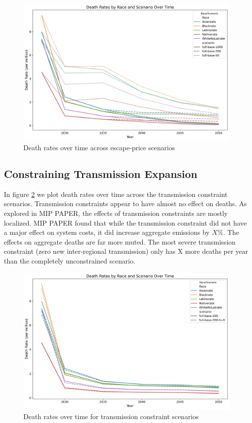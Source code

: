 \documentclass[a4paper]{article}
\theoremstyle{definition}
\theoremstyle{plain}
\begin{document}
\begin{figure}
    \centering
    \includegraphics[width=1\linewidth]{Figures/Output/Compare_scenarios_compare-escape-price_GenX.jpg}
    \caption{Death rates over time across escape-price scenarios}
    \label{EscapePrice}
\end{figure}

\subsection{Constraining Transmission Expansion}
In figure \ref{TransmissionConstraint} we plot death rates over time across the transmission constraint scenarios. Transmission constraints appear to have almost no effect on deaths.  As explored in MIP PAPER, the effects of transmission constraints are mostly localized.  MIP PAPER found that while the transmission constraint did not have a major effect on system costs, it did increase aggregate emissions by $X\%$.  The effects on aggregate deaths are far more muted.  The most severe transmission constraint (zero new inter-regional transmission) only has X more deaths per year than the completely unconstrained scenario.
\begin{figure}
    \centering
    \includegraphics[width=1\linewidth]{Figures/Output/Compare_scenarios_transmissions-constraint_GenX.jpg}
    \caption{Death rates over time for transmission constraint scenarios}
    \label{TransmissionConstraint}
\end{figure}
\end{document}
